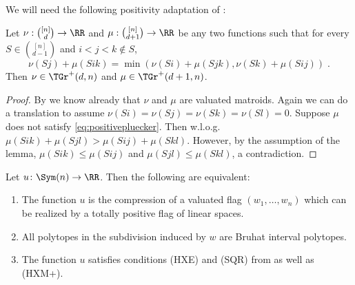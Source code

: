 %

We will need the following positivity adaptation of :
\begin{lemma}\label{lemma:1step_positive}
	Let $\nu : \binom{[n]}{d} \to \RR$ and $\mu : \binom{[n]}{d+1} \to \RR$ be any two functions such that for every $S\in \binom{[n]}{d-1}$ and $i<j<k \notin S$, 
	\[
	\nu(Sj)+\mu(Sik) = \min(\nu(Si)+\mu(Sjk),\nu(Sk)+\mu(Sij)) \;.
	\]
	Then $\nu\in \TGr^+(d,n)$ and $\mu \in  \TGr^+(d+1,n)$.
\end{lemma}
\begin{proof}
	By  we know already that $\nu$ and $\mu$ are valuated matroids. 
	Again we can do a translation to assume $\nu(Si)=\nu(Sj)=\nu(Sk)=\nu(Sl)=0$.
	Suppose $\mu$ does not satisfy \eqref{eq:positivepluecker}.
	Then w.l.o.g.~$\mu(Sik)+\mu(Sjl)>\mu(Sij)+\mu(Skl)$. 
	However, by the assumption of the lemma, $\mu(Sik)\leq \mu(Sij)$ and $\mu(Sjl) \leq \mu(Skl)$, a contradiction. 
\end{proof}

\begin{theorem}\label{thm:positivity}
  Let $u \colon \Sym(n) \to \RR$.
  Then the following are equivalent:
	\begin{enumerate}
		\item The function $u$ is the compression of a valuated flag $(w_1,\dots, w_n)$ which can be realized by a totally positive flag of linear spaces.
		\item All polytopes in the subdivision induced by $w$ are Bruhat interval polytopes.
		\item The function $u$ satisfies conditions (HXE) and (SQR) from  as well as (HXM+).
	\end{enumerate}
\end{theorem}

